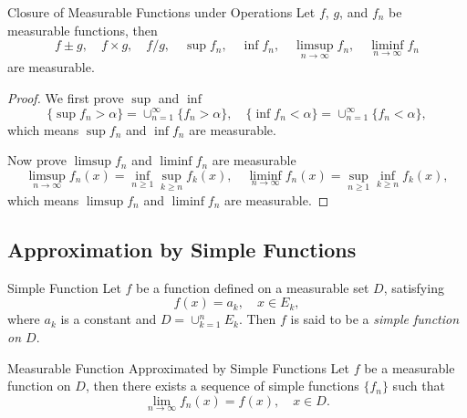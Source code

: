 \begin{proposition}{Closure of Measurable Functions under Operations}{}
  Let $f$, $g$, and $f_n$ be measurable functions, then
  \begin{equation}
    f \pm g, \quad f \times g, \quad f / g, \quad \sup f_n, \quad \inf f_n, \quad
    \limsup \limits_{n \rightarrow \infty}f_n, \quad
    \liminf \limits_{n \rightarrow \infty}f_n
  \end{equation}
  are measurable.
\end{proposition}

\begin{proof}
  We first prove $\sup$ and $\inf$
  \begin{equation}
    \{\sup f_n > \alpha\} = \cup _{n = 1}^{\infty} \{f_n > \alpha\}, \quad
    \{\inf f_n < \alpha\} = \cup _{n = 1}^{\infty} \{f_n < \alpha\},
  \end{equation}
  which means $\sup f_n$ and $\inf f_n$ are measurable.

  Now prove $\limsup f_n$ and $\liminf f_n$ are measurable
  \begin{equation}
    \limsup _{n \rightarrow \infty} f_n(x) = \inf_{n \geq 1} \sup_{k \geq n}f_k(x),
    \quad
    \liminf _{n \rightarrow \infty} f_n(x) = \sup _{n \geq 1} \inf_{k \geq n}f_k(x),
  \end{equation}
  which means $\limsup f_n$ and $\liminf f_n$ are measurable.
\end{proof}

\subsection{Approximation by Simple Functions}

\begin{definition}{Simple Function}{}
  Let $f$ be a function defined on a measurable set $D$, satisfying
  \begin{equation}
    f(x) = a_k, \quad x \in E_k,
  \end{equation}
  where $a_k$ is a constant and $D = \cup _{k = 1}^n E_k$.
  Then $f$ is said to be a \emph{simple function on $D$}.
\end{definition}

\begin{theorem}{Measurable Function Approximated by Simple Functions}{}
  Let $f$ be a measurable function on $D$,
  then there exists a sequence of simple functions $\{f_n\}$ such that
  \begin{equation}
    \lim \limits _{n \rightarrow \infty} f_n(x) = f(x), \quad x \in D.
  \end{equation}
\end{theorem}

